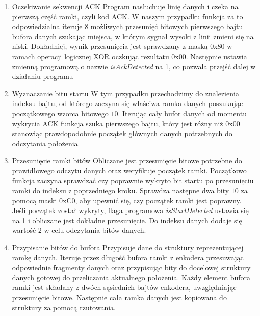 \begin{enumerate}
    \item Oczekiwanie sekwencji ACK \newline
    Program nasłuchuje linię danych i czeka na pierwszą część ramki, czyli kod ACK. W naszym przypadku funkcja za to odpowiedzialna iteruje 8 możliwych przesunięć bitowych pierwszego bajtu bufora danych szukając miejsca, w którym sygnał wysoki z linii zmieni się na niski. Dokładniej, wynik przesunięcia jest sprawdzany z maską 0x80 w ramach operacji logicznej XOR oczkując rezultatu 0x00. Następnie ustawia zmienną programową o nazwie \textit{isAckDetected} na 1, co pozwala przejść dalej w działaniu programu

\vspace{0.5cm}

    \item Wyznaczanie bitu startu \newline
    W tym przypadku przechodzimy do znalezienia indeksu bajtu, od którego zaczyna się właściwa ramka danych poszukując początkowego wzorca bitowego $10$. Iterując cały bufor danych od momentu wykrycia ACK funkcja szuka pierwszego bajtu, który jest różny niż 0x00 stanowiąc prawdopodobnie początek głównych danych potrzebnych do odczytania położenia.

\vspace{0.5cm}
    
    \item Przesunięcie ramki bitów \newline
    Obliczane jest przesunięcie bitowe potrzebne do prawidłowego odczytu danych oraz weryfikuje początek ramki. Początkowo funkcja zaczyna sprawdzać czy poprawnie wykryto bit startu po przesunięciu ramki do indeksu z poprzedniego kroku. Sprawdza następne dwa bity $10$ za pomocą maski 0xC0, aby upewnić się, czy początek ramki jest poprawny. Jeśli początek został wykryty, flaga programowa \textit{isStartDetected} ustawia się na 1 i obliczane jest dokładne przesunięcie. Do indeksu danych dodaje się wartość 2 w celu odczytania bitów danych.

\vspace{0.5cm}
    \item Przypisanie bitów do bufora \newline 
    Przypisuje dane do struktury reprezentującej ramkę danych. Iteruje przez długość bufora ramki z enkodera przesuwając odpowiednie fragmenty danych oraz przypisując bity do docelowej struktury danych gotowej do przeliczania aktualnego położenia. Każdy element bufora ramki jest składany z dwóch sąsiednich bajtów enkodera, uwzględniając przesunięcie bitowe. Następnie cała ramka danych jest kopiowana do struktury za pomocą rzutowania.


\end{enumerate}
